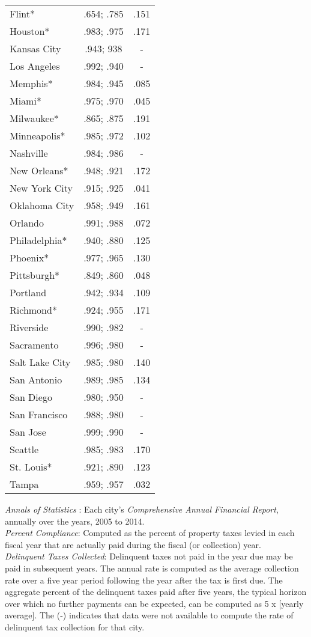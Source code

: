\documentclass[12pt,titlepage]{article}
\begin{document}
\begin{center}
\begin{longtable}{| l | c |  c|}
Flint*	         & .654;  .785	 & .151 \\
Houston*	 & .983;  .975	 & .171 \\
Kansas City	 & .943; 938	 & - \\
Los Angeles	 & .992;  .940	 & - \\
Memphis*	 & .984;  .945	 & .085 \\
Miami*	         & .975;  .970	 & .045 \\
Milwaukee*	 & .865;  .875	 & .191 \\
Minneapolis*	 & .985;  .972	 & .102 \\
Nashville	 & .984;  .986	 & - \\
New Orleans*	 & .948;  .921	 & .172 \\
New York City	 & .915;  .925	 & .041 \\
Oklahoma City	 & .958;  .949	 & .161 \\
Orlando	         & .991;  .988	 & .072 \\
Philadelphia*	 & .940;  .880	 & .125 \\
Phoenix*	 & .977;  .965	 & .130 \\
Pittsburgh*	 & .849;  .860	 & .048 \\
Portland	 & .942;  .934	 & .109 \\
Richmond*	 & .924;  .955	 & .171 \\
Riverside	 & .990;  .982	 & - \\
Sacramento	 & .996;  .980	 & - \\
Salt Lake City	 & .985;  .980	 & .140 \\
San Antonio	 & .989;  .985	 & .134 \\
San Diego	 & .980;  .950	 & - \\
San Francisco	 & .988;  .980	 & - \\
San Jose	 & .999;  .990	 & - \\
Seattle	         & .985;  .983	 & .170 \\
St.  Louis*	 & .921;  .890	 & .123 \\
Tampa	         & .959;  .957	 & .032 \\
\end{longtable}
\end{center}
\textit{Annals of Statistics} : Each city's {\it Comprehensive Annual Financial Report}, annually over the years, 2005 to 2014.  \\
\textit{Percent Compliance}: Computed as the percent of property taxes levied in each fiscal year that are actually paid during the fiscal (or collection) year.  \\
\textit{Delinquent Taxes Collected}: Delinquent taxes not paid in the year due may be  paid in subsequent years.  The annual rate is computed as the average collection rate over a five year period following the year after the tax is first due.  The aggregate percent of the delinquent taxes paid after five years, the typical horizon over which no further payments can be expected, can be computed as 5 x [yearly average].   The (-) indicates that data were not available to compute the rate of delinquent tax collection for that city.  \\
\end{document}
